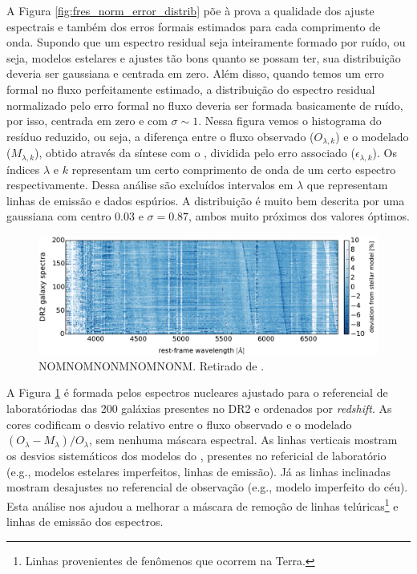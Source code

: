 A Figura \ref{fig:fres_norm_error_distrib} põe à prova a qualidade dos ajuste espectrais e também dos erros formais estimados para cada comprimento de onda. Supondo que um espectro residual seja inteiramente formado por ruído, ou seja, modelos estelares e ajustes tão bons quanto se possam ter, sua distribuição deveria ser gaussiana e centrada em zero. Além disso, quando temos um erro formal no fluxo perfeitamente estimado, a distribuição do espectro residual normalizado pelo erro formal no fluxo deveria ser formada basicamente de ruído, por isso, centrada em zero e com $\sigma \sim 1$. Nessa figura vemos o histograma do resíduo reduzido, ou seja, a diferença entre o fluxo observado ($O_{\lambda,k}$) e o modelado ($M_{\lambda,k}$), obtido através da síntese com o \starlight, dividida pelo erro associado ($\epsilon_{\lambda,k}$). Os índices $\lambda$ e $k$ representam um certo comprimento de onda de um certo espectro respectivamente. Dessa análise são excluídos intervalos em $\lambda$ que representam linhas de emissão e dados espúrios. A distribuição é muito bem descrita por uma gaussiana com centro 0.03 e $\sigma = 0.87$, ambos muito próximos dos valores óptimos.

\begin{figure}
	\centering
	\includegraphics[scale=0.5]{figuras/DR2_stacked_residuals.pdf}
	\caption[DR2: Espectros residuais nucleares]
	{NOMNOMNONMNOMNONM. Retirado de \citet{GarciaBenito.etal.2015a}.}
	\label{fig:fnuc_stack}
\end{figure}

A Figura \ref{fig:fnuc_stack} é formada pelos espectros nucleares ajustado para o referencial de laboratóriodas das 200 galáxias presentes no DR2 e ordenados por {\em redshift}. As cores codificam o desvio relativo entre o fluxo observado e o modelado $(O_\lambda - M_\lambda)/O_\lambda$, sem nenhuma máscara espectral. As linhas verticais mostram os desvios sistemáticos dos modelos do \starlight, presentes no refericial de laboratório (e.g., modelos estelares imperfeitos, linhas de emissão). Já as linhas inclinadas mostram desajustes no referencial de observação (e.g., modelo imperfeito do céu). Esta análise nos ajudou a melhorar a máscara de remoção de linhas telúricas\footnote{Linhas provenientes de fenômenos que ocorrem na Terra.} e linhas de emissão dos espectros.


